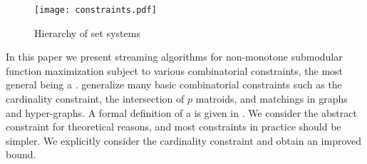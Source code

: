 \documentclass[oneside,letterpaper]{scrartcl} \usepackage{macros}
\begin{document}
\begin{wrapfigure}{r}{.45\textwidth}
\centering
  \texttt{[image: constraints.pdf]}
\caption{Hierarchy of set systems}
\end{wrapfigure}
In this paper we present streaming algorithms for non-monotone
submodular function maximization subject to various combinatorial
constraints, the most general being a .
 generalize many basic
combinatorial constraints such as the cardinality constraint, the
intersection of $p$ matroids, and matchings in graphs and
hyper-graphs.  A formal definition of a  is given in
. We consider the abstract
 constraint for theoretical reasons, and most
constraints in practice should be simpler. We explicitly consider the
cardinality constraint and obtain an improved bound.
\end{document}
